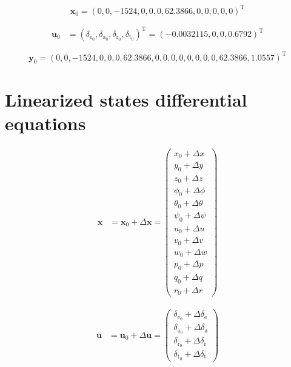 \documentclass{article}
\begin{document}
\begin{dmath}
\bm{x_{\mathrm{0}}}=(0, 0, -1524, 0, 0, 0, 62.3866, 0, 0, 0, 0, 0)^{\mathrm{T}}
\end{dmath}

\begin{dmath}
\begin{aligned}
\bm{u_{\mathrm{0}}}&=(\delta_{\mathrm{e}_0}, \delta_{\mathrm{a}_0}, \delta_{\mathrm{r}_0}, \delta_{\mathrm{t}_0})^{\mathrm{T}}=(-0.0032115, 0, 0, 0.6792)^{\mathrm{T}}
\end{aligned}
\end{dmath}

\begin{dmath}
\bm{y_{\mathrm{0}}}=(0, 0, -1524, 0, 0, 0, 62.3866, 0, 0, 0, 0, 0, 0, 0, 0, 62.3866, 1.0557)^{\mathrm{T}}
\end{dmath}

\section{Linearized states differential equations}

\begin{dmath}
\begin{aligned}
\bm{x}&=\bm{x}_0+\Delta \bm{x}=\left(\begin{array}{c} x_0 + \Delta x\\ y_0 + \Delta y\\ z_0 + \Delta z\\ \phi_0 + \Delta \phi \\ \theta_0 + \Delta \theta \\ \psi_0 + \Delta \psi \\ u_0 + \Delta u\\ v_0 + \Delta v\\ w_0 + \Delta w\\ p_0 + \Delta p\\ q_0 + \Delta q\\ r_0 + \Delta r \end{array}\right)
\end{aligned}
\end{dmath}

\begin{dmath}
\begin{aligned}
\bm{u}&=\bm{u}_0+\Delta \bm{u}=\left(\begin{array}{c} \delta_{\mathrm{e}_0}+\Delta \delta_{\mathrm{e}}\\ \delta_{\mathrm{a}_0}+\Delta \delta_{\mathrm{a}}\\ \delta_{\mathrm{r}_0}+\Delta \delta_{\mathrm{r}}\\ \delta_{\mathrm{t}_0}+\Delta \delta_{\mathrm{t}} \end{array}\right)
\end{aligned}
\end{dmath}
\end{document}
